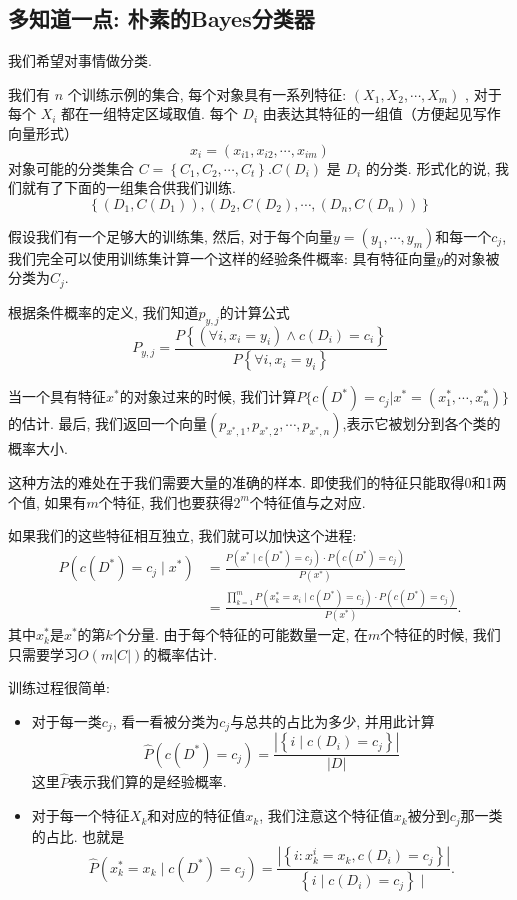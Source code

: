 \subsection{多知道一点: 朴素的Bayes分类器}
我们希望对事情做分类. 

我们有 $n$ 个训练示例的集合, 每个对象具有一系列特征: $\left(X_1, X_2, \cdots, X_m\right)$ , 对于每个 $X_i$ 都在一组特定区域取值. 
每个 $D_i$ 由表达其特征的一组值（方便起见写作向量形式）
$$
x_i=\left(x_{i 1}, x_{i 2}, \cdots, x_{i m}\right)
$$
对象可能的分类集合 $C=\left\{C_1, C_2, \cdots, C_t\right\} . C\left(D_i\right)$ 是 $D_i$ 的分类. 
形式化的说, 我们就有了下面的一组集合供我们训练. 
$$\left\{\left(D_1, C\left(D_1\right)\right),\left(D_2, C\left(D_2\right), \cdots,\left(D_n, C\left(D_n\right)\right)\right\}\right.$$

假设我们有一个足够大的训练集, 然后, 对于每个向量\( y=\left(y_1, \cdots, y_m\right) \)和每一个$c_j$, 我们完全可以使用训练集计算一个这样的经验条件概率: 具有特征向量$y$的对象被分类为$C_j$.

根据条件概率的定义, 我们知道$p_{y,j}$的计算公式
$$
P_{y, j}=\frac{P\left\{\left(\forall i, x_i=y_i\right) \wedge c\left(D_i\right)=c_i\right\}}{P\left\{\forall i, x_i=y_i\right\}}
$$

当一个具有特征$x^*$的对象过来的时候, 我们计算$P\{c(D^*)=c_j | x^* =(x_1^*,\cdots, x_n^*)\}$的估计. 最后, 我们返回一个向量$(p_{x^*, 1},p_{x^*, 2},\cdots, p_{x^*, n})$,表示它被划分到各个类的概率大小.

这种方法的难处在于我们需要大量的准确的样本. 即使我们的特征只能取得0和1两个值, 如果有$m$个特征, 我们也要获得$2^m$个特征值与之对应. 

如果我们的这些特征相互独立, 我们就可以加快这个进程: 
$$
\begin{aligned}
P\left(c\left(D^*\right)=c_j \mid x^*\right) & =\frac{P\left(x^* \mid c\left(D^*\right)=c_j\right) \cdot P\left(c\left(D^*\right)=c_j\right)}{P\left(x^*\right)} \\
& =\frac{\prod_{k=1}^m P\left(x_k^*=x_i \mid c\left(D^*\right)=c_j\right) \cdot P\left(c\left(D^*\right)=c_j\right)}{P\left(x^*\right)} .
\end{aligned}
$$
其中$x_k^*$是$x^*$的第$k$个分量. 由于每个特征的可能数量一定, 在$m$个特征的时候, 我们只需要学习$O(m|C|)$的概率估计. 

训练过程很简单: 
\begin{itemize}
    \item 对于每一类$c_j$, 看一看被分类为$c_j$与总共的占比为多少, 并用此计算$$
    \hat{P}\left(c\left(D^*\right)=c_j\right)=\frac{\left|\left\{i \mid c\left(D_i\right)=c_j\right\}\right|}{|D|}
    $$这里$\hat P$表示我们算的是经验概率.
    \item 对于每一个特征$X_k$和对应的特征值$x_k$, 我们注意这个特征值$x_k$被分到$c_j$那一类的占比. 也就是$$
    \hat{P}\left(x_k^*=x_k \mid c\left(D^*\right)=c_j\right)=\frac{\left|\left\{i: x_k^i=x_k, c\left(D_i\right)=c_j\right\}\right|}{\left\{i \mid c\left(D_i\right)=c_j\right\} \mid} .
    $$
\end{itemize}

